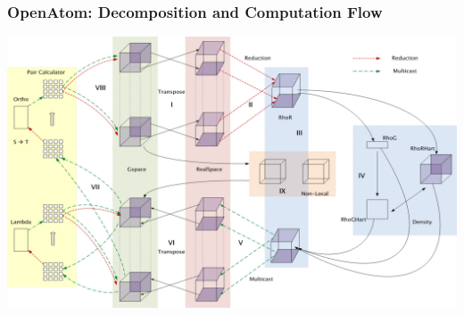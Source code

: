 \begin{frame}[t]
\frametitle{OpenAtom: Decomposition and Computation Flow}
  \begin{center} \includegraphics[width=\textwidth]{figures/openatom_array.pdf} \end{center}
\end{frame}


